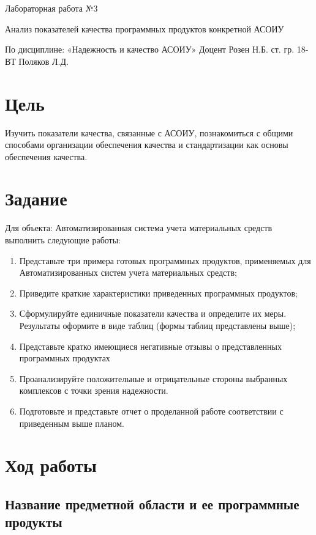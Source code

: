 \documentclass[14pt]{extarticle}
\let\oldsection\section
\renewcommand\section{\clearpage\oldsection}
\begin{document}
\unititle
{\klgtu}
{\fapu}
{\suvt}
{ Лабораторная работа №3 \par Анализ показателей качества программных продуктов конкретной АСОИУ }
{По дисциплине: «Надежность и качество АСОИУ»}
{Доцент}
{Розен Н.Б.}
{ст. гр. 18-ВТ}
{Поляков Л.Д.}

\tableofcontents

\section{Цель}

Изучить показатели качества, связанные с АСОИУ, познакомиться с общими способами организации обеспечения качества и стандартизации как основы обеспечения качества.

\section{Задание}

Для объекта: Автоматизированная система учета материальных средств выполнить следующие работы:
\begin{enumerate}

	\item Представьте три примера готовых программных продуктов, применяемых для Автоматизированных систем учета материальных средств;
	\item Приведите краткие характеристики приведенных программных продуктов;
	\item Сформулируйте единичные показатели качества и определите их меры. Результаты оформите в виде таблиц (формы таблиц представлены выше);
	\item Представьте кратко имеющиеся негативные отзывы о представленных программных продуктах
	\item Проанализируйте положительные и отрицательные стороны выбранных комплексов с точки зрения надежности. 
	\item Подготовьте и представьте отчет о проделанной работе соответствии с приведенным выше планом.
\end{enumerate}

\section{Ход работы}

\subsection{Название предметной области и ее программные продукты}
\end{document}
